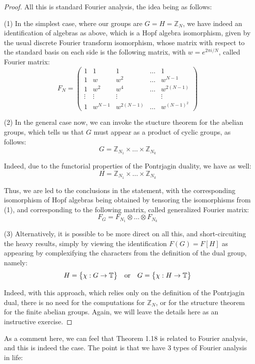 \documentclass[12pt]{amsbook}
\begin{document}
\begin{proof}
All this is standard Fourier analysis, the idea being as follows:

\medskip

(1) In the simplest case, where our groups are $G=H=\mathbb Z_N$, we have indeed an identification of algebras as above, which is a Hopf algebra isomorphism, given by the usual discrete Fourier transform isomorphism, whose matrix with respect to the standard basis on each side is the following matrix, with $w=e^{2\pi i/N}$, called Fourier matrix:
$$F_N=
\begin{pmatrix}
1&1&1&\ldots&1\\
1&w&w^2&\ldots&w^{N-1}\\
1&w^2&w^4&\ldots&w^{2(N-1)}\\
\vdots&\vdots&\vdots&&\vdots\\
1&w^{N-1}&w^{2(N-1)}&\ldots&w^{(N-1)^2}
\end{pmatrix}$$

(2) In the general case now, we can invoke the stucture theorem for the abelian groups, which tells us that $G$ must appear as a product of cyclic groups, as follows:
$$G=\mathbb Z_{N_1}\times\ldots\times\mathbb Z_{N_k}$$

Indeed, due to the functorial properties of the Pontrjagin duality, we have as well:
$$H=\mathbb Z_{N_1}\times\ldots\times\mathbb Z_{N_k}$$

Thus, we are led to the conclusions in the statement, with the corresponding isomorphism of Hopf algebras being obtained by tensoring the isomorphisms from (1), and corresponding to the following matrix, called generalized Fourier matrix:
$$F_G=F_{N_1}\otimes\ldots\otimes F_{N_k}$$

(3) Alternatively, it is possible to be more direct on all this, and short-circuiting the heavy results, simply by viewing the identification $F(G)=F[H]$ as appearing by complexifying the characters from the definition of the dual group, namely:
$$H=\big\{\chi:G\to\mathbb T\big\}\quad {\rm or}\quad 
G=\big\{\chi:H\to\mathbb T\big\}$$

Indeed, with this approach, which relies only on the definition of the Pontrjagin dual, there is no need for the computations for $\mathbb Z_N$, or for the structure theorem for the finite abelian groups. Again, we will leave the details here as an instructive exercise.
\end{proof}

As a comment here, we can feel that Theorem 1.18 is related to Fourier analysis, and this is indeed the case. The point is that we have 3 types of Fourier analysis in life:
\end{document}
